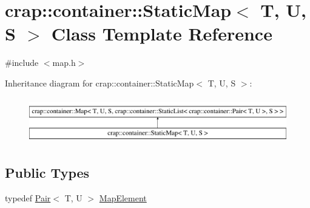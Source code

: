 \hypertarget{classcrap_1_1container_1_1_static_map}{\section{crap\-:\-:container\-:\-:Static\-Map$<$ T, U, S $>$ Class Template Reference}
\label{classcrap_1_1container_1_1_static_map}
}


{\ttfamily \#include $<$map.\-h$>$}

Inheritance diagram for crap\-:\-:container\-:\-:Static\-Map$<$ T, U, S $>$\-:\begin{figure}[H]
\begin{center}
\leavevmode
\includegraphics[height=2.000000cm]{classcrap_1_1container_1_1_static_map}
\end{center}
\end{figure}
\subsection*{Public Types}
\begin{DoxyCompactItemize}
\item 
typedef \hyperlink{structcrap_1_1container_1_1_pair}{Pair}$<$ T, U $>$ \hyperlink{classcrap_1_1container_1_1_map_a87121369de54f6650c8a84a0a19fab32}{Map\-Element}
\end{DoxyCompactItemize}
